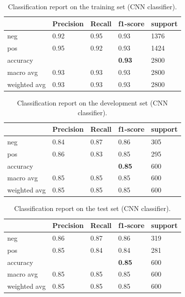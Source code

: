 \documentclass[10pt, a4paper]{article}
\begin{document}
	\begin{table}
		\begin{tabular}{|l|l|l|l|l|}
			\hline
			\cellcolor{blue!25}\textbf{} & \cellcolor{blue!25}\textbf{Precision} &
			\cellcolor{blue!25}\textbf{Recall}  &
			\cellcolor{blue!25}\textbf{f1-score}  &
			\cellcolor{blue!25}\textbf{support}\\
			\hline
			neg & 0.92 & 0.95 & 0.93 & 1376 \\\hline
			pos & 0.95  & 0.92 & 0.93 & 1424 \\\hline
			accuracy & & & \textbf{0.93} & 2800 \\\hline
			macro avg & 0.93 & 0.93 & 0.93 & 2800 \\\hline
			weighted avg & 0.93 & 0.93 & 0.93 & 2800 \\\hline
			
		\end{tabular}
		\centering
		\caption{Classification report on the training set (CNN classifier).}
		\label{tab::ex-2-report-train}
	\end{table}
	
	\begin{table}
		\begin{tabular}{|l|l|l|l|l|}
			\hline
			\cellcolor{blue!25}\textbf{} & \cellcolor{blue!25}\textbf{Precision} &
			\cellcolor{blue!25}\textbf{Recall}  &
			\cellcolor{blue!25}\textbf{f1-score}  &
			\cellcolor{blue!25}\textbf{support}\\
			\hline
			neg & 0.84 & 0.87 & 0.86 & 305 \\\hline
			pos & 0.86  & 0.83 & 0.85 & 295 \\\hline
			accuracy & & & \textbf{0.85} & 600 \\\hline
			macro avg & 0.85 & 0.85 & 0.85 & 600 \\\hline
			weighted avg & 0.85 & 0.85 & 0.85 & 600 \\\hline
			
		\end{tabular}
		\centering
		\caption{Classification report on the development set (CNN classifier).}
		\label{tab::ex-2-report-dev}
	\end{table}
	
	\begin{table}
		\begin{tabular}{|l|l|l|l|l|}
			\hline
			\cellcolor{blue!25}\textbf{} & \cellcolor{blue!25}\textbf{Precision} &
			\cellcolor{blue!25}\textbf{Recall}  &
			\cellcolor{blue!25}\textbf{f1-score}  &
			\cellcolor{blue!25}\textbf{support}\\
			\hline
			neg & 0.86 & 0.87 & 0.86 & 319 \\\hline
			pos & 0.85  & 0.84 & 0.84 & 281 \\\hline
			accuracy & & & \textbf{0.85} & 600 \\\hline
			macro avg & 0.85 & 0.85 & 0.85 & 600 \\\hline
			weighted avg & 0.85 & 0.85 & 0.85 & 600 \\\hline
			
		\end{tabular}
		\centering
		\caption{Classification report on the test set (CNN classifier).}
		\label{tab::ex-2-report-test}
	\end{table}
	
\end{document}
